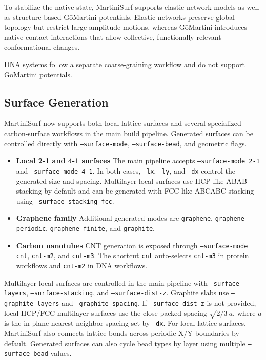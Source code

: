 \documentclass[11pt]{article}
\begin{document}
To stabilize the native state, MartiniSurf supports elastic network models as well
as structure-based G\=oMartini potentials.
Elastic networks preserve global topology but restrict large-amplitude motions,
whereas G\=oMartini introduces native-contact interactions that allow collective,
functionally relevant conformational changes.

DNA systems follow a separate coarse-graining workflow and do not support
G\=oMartini potentials.


\subsection{Surface Generation}

MartiniSurf now supports both local lattice surfaces and several
specialized carbon-surface workflows in the main build pipeline.
Generated surfaces can be controlled directly with
\texttt{--surface-mode}, \texttt{--surface-bead}, and geometric flags.

\begin{itemize}
  \item \textbf{Local 2-1 and 4-1 surfaces}  
  The main pipeline accepts \texttt{--surface-mode 2-1} and
  \texttt{--surface-mode 4-1}. In both cases, \texttt{--lx},
  \texttt{--ly}, and \texttt{--dx} control the generated size and spacing.
  Multilayer local surfaces use HCP-like ABAB stacking by default and
  can be generated with FCC-like ABCABC stacking using
  \texttt{--surface-stacking fcc}.

  \item \textbf{Graphene family}  
  Additional generated modes are
  \texttt{graphene}, \texttt{graphene-periodic},
  \texttt{graphene-finite}, and \texttt{graphite}.

  \item \textbf{Carbon nanotubes}  
  CNT generation is exposed through
  \texttt{--surface-mode cnt}, \texttt{cnt-m2}, and \texttt{cnt-m3}.
  The shortcut \texttt{cnt} auto-selects \texttt{cnt-m3} in protein
  workflows and \texttt{cnt-m2} in DNA workflows.
\end{itemize}

Multilayer local surfaces are controlled in the main pipeline with
\texttt{--surface-layers}, \texttt{--surface-stacking}, and
\texttt{--surface-dist-z}. Graphite slabs use \texttt{--graphite-layers}
and \texttt{--graphite-spacing}.
If \texttt{--surface-dist-z} is not provided, local HCP/FCC multilayer
surfaces use the close-packed spacing \(\sqrt{2/3}\,a\), where
\(a\) is the in-plane nearest-neighbor spacing set by \texttt{--dx}.
For local lattice surfaces, MartiniSurf also connects lattice bonds across
periodic X/Y boundaries by default.
Generated surfaces can also cycle bead types by layer using multiple
\texttt{--surface-bead} values.
\end{document}
